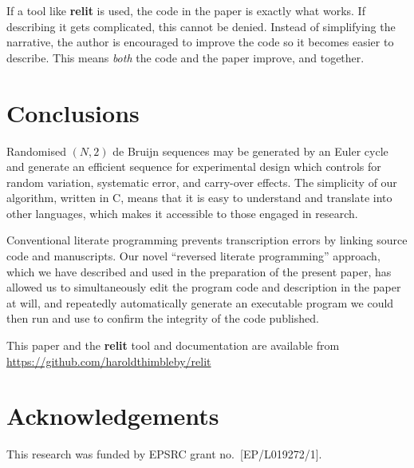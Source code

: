 \documentclass[12pt]{article}
\def\name#1{\textbf{#1}}
\begin{document}
If a tool like \name{relit} is used, the code in the paper is exactly what works. If describing it gets complicated, this cannot be denied. Instead of simplifying the narrative, the author is encouraged to improve the code so it becomes easier to describe. This means \emph{both\/} the code and the paper improve, and together.

\section{Conclusions}
Randomised $(N,2)$ de Bruijn sequences may be generated by an Euler cycle and generate an efficient sequence for experimental design which controls for random variation, systematic error, and carry-over effects. The simplicity of our algorithm, written in C, means that it is easy to understand and translate into other languages, which makes it accessible to those engaged in research. 

Conventional literate programming prevents transcription errors by linking source code and manuscripts. Our novel ``reversed literate programming'' approach, which we have described and used in the preparation of the present paper, has allowed us to simultaneously edit the program code and description in the paper at will, and repeatedly automatically generate an executable program we could then run and use to confirm the integrity of the code published.

This paper and the \name{relit} tool and documentation are available from \url{https://github.com/haroldthimbleby/relit}



\section*{Acknowledgements}
This research was funded by EPSRC grant no.~[EP/L019272/1].

\let\oldbibitem=\bibitem
\def\bibitem{\frenchspacing\raggedright\oldbibitem}


\end{document}
